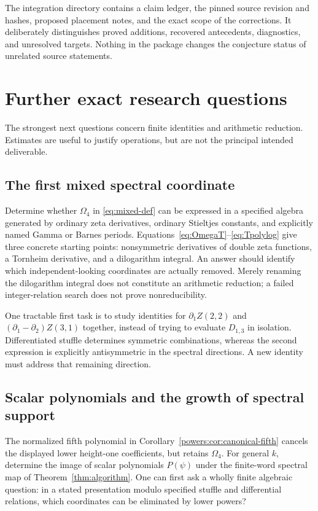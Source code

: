 The integration directory contains a claim ledger, the pinned source
revision and hashes, proposed placement notes, and the exact scope of
the corrections.  It deliberately distinguishes proved additions,
recovered antecedents, diagnostics, and unresolved targets.  Nothing
in the package changes the conjecture status of unrelated source
statements.

\section{Further exact research questions}
\label{sec:questions}

The strongest next questions concern finite identities and arithmetic
reduction.  Estimates are useful to justify operations, but are not
the principal intended deliverable.

\subsection{The first mixed spectral coordinate}

Determine whether $\Omega_4$ in \eqref{eq:mixed-def} can be expressed
in a specified algebra generated by ordinary zeta derivatives,
ordinary Stieltjes constants, and explicitly named Gamma or Barnes
periods.  Equations~\eqref{eq:OmegaT}--\eqref{eq:Tpolylog} give
three concrete starting points: nonsymmetric derivatives of double
zeta functions, a Tornheim derivative, and a dilogarithm integral.
An answer should identify which independent-looking coordinates are
actually removed.  Merely renaming the dilogarithm integral does not
constitute an arithmetic reduction; a failed integer-relation search
does not prove nonreducibility.

One tractable first task is to study identities for
$\partial_1Z(2,2)$ and $(\partial_1-\partial_2)Z(3,1)$ together,
instead of trying to evaluate $D_{1,3}$ in isolation.  Differentiated
stuffle determines symmetric combinations, whereas the second
expression is explicitly antisymmetric in the spectral directions.
A new identity must address that remaining direction.

\subsection{Scalar polynomials and the growth of spectral support}

The normalized fifth polynomial in
Corollary~\ref{powers:cor:canonical-fifth} cancels the displayed
lower height-one coefficients, but retains $\Omega_4$.  For general
$k$, determine the image of scalar polynomials
$P(\psi)$ under the finite-word spectral map of
Theorem~\ref{thm:algorithm}.  One can first ask a wholly finite
algebraic question: in a stated presentation modulo specified stuffle
and differential relations, which coordinates can be eliminated by
lower powers?

